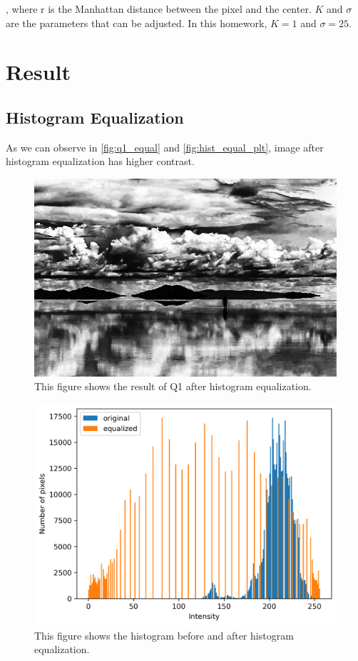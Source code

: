 \documentclass[twocolumn]{extarticle}
\begin{document}
, where r is the Manhattan distance between the pixel and the center. $K$ and $\sigma$ are the parameters that can be adjusted. In this homework, $K=1$ and $\sigma=25$.

\section{Result}

\subsection{Histogram Equalization}

As we can observe in \autoref{fig:q1_equal} and \autoref{fig:hist_equal_plt}, image after histogram equalization has higher contrast.

\begin{figure}[H]
\centering
\includegraphics[width=0.9\linewidth]{figure/Q1_equal}
\caption{This figure shows the result of Q1 after histogram equalization.}
\label{fig:q1_equal}
\end{figure}

\begin{figure}[H]
\centering
\includegraphics[width=0.9\linewidth]{figure/hist_equal_plt}
\caption{This figure shows the histogram before and after histogram equalization.}
\label{fig:hist_equal_plt}
\end{figure}
\end{document}
